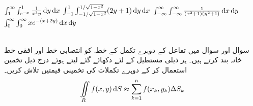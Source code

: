 $\int_1^{\infty}\int_{e^{-x}}^1\frac{1}{x^3y}\dif y\dif x$
$\int_{-1}^1\int_{-1/\sqrt{1-x^2}}^{1/\sqrt{1-x^2}}(2y+1)\dif y\dif x$
$\int_{-\infty}^{\infty}\int_{-\infty}^{\infty}\frac{1}{(x^2+1)(y^2+1)}\dif x\dif y$
$\int_0^{\infty}\int_0^{\infty}xe^{-(x+2y)}\dif x\dif y$

\\
سوال  اور سوال  میں تفاعل   کے  دوہرے  تکمل   کے خطہ  کو انتصابی خط  اور افقی خط   خانہ بند کرتے ہیں۔ ہر    ذیلی مستطیل کے لئے  دکھائے گئے   لیتے ہوئے  درج  ذیل تخمین استعمال کر  کے دوہرے تکملات کی تخمینی قیمتیں تلاش کریں۔
\begin{align*}
\iint\limits_R f(x,y)\dif S\approx \sum\limits_{k=1}^{n}f(x_k,y_k)\Delta S_k
\end{align*}

